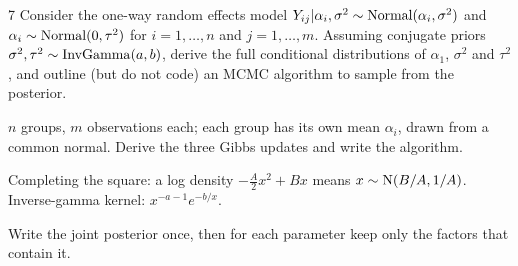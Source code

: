 \documentclass[11pt]{article}
\begin{document}

\begin{problem}{7}
Consider the one-way random effects model $Y_{ij}|\alpha_i,\sigma^2\sim\mathrm{Normal}(\alpha_i,\sigma^2)$ and $\alpha_i\sim\mathrm{Normal}(0,\tau^2)$ for $i=1,\dots,n$ and $j=1,\dots,m$. Assuming conjugate priors $\sigma^2,\tau^2\sim\mathrm{InvGamma}(a,b)$, derive the full conditional distributions of $\alpha_1$, $\sigma^2$ and $\tau^2$, and outline (but do not code) an MCMC algorithm to sample from the posterior.
\end{problem}

\begin{restate}
$n$ groups, $m$ observations each; each group has its own mean $\alpha_i$, drawn from a common normal. Derive the three Gibbs updates and write the algorithm.
\end{restate}

\begin{recall}
Completing the square: a log density $-\frac A2x^2+Bx$ means $x\sim\mathrm{N}(B/A,1/A)$. Inverse-gamma kernel: $x^{-a-1}e^{-b/x}$.
\end{recall}

\begin{keyidea}
Write the joint posterior once, then for each parameter keep only the factors that contain it.
\end{keyidea}
\end{document}
